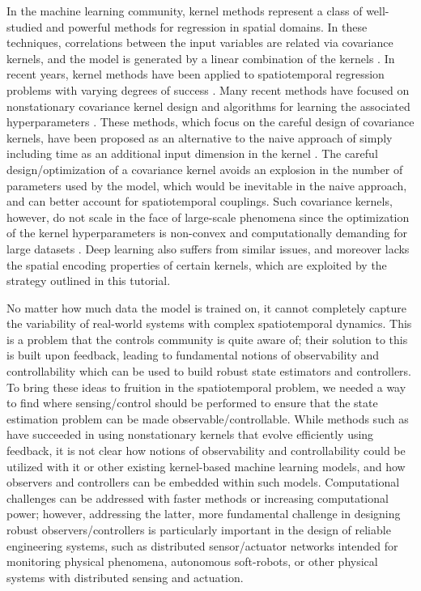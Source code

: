 \documentclass[letterpaper,12pt,peerreviewca,draftcls]{IEEEtran}
\begin{document}
In the machine learning community, kernel methods represent a class of well-studied and powerful methods for regression in spatial domains. In these techniques, correlations between the input variables are related via covariance kernels, and the model is generated by a linear combination of the kernels \cite{RasmussenWilliams2005,schoelkopf01kernelbased,scholkopf2002learning}. In recent years, kernel methods have been applied to spatiotemporal regression problems with varying degrees of success \cite{cressie2011statistics,RasmussenWilliams2005}. Many recent methods have focused on nonstationary covariance kernel design and algorithms for learning the associated hyperparameters \cite{garg2012AAAI,ma2003nonstationary,plagemann2008nonstationary,todescato2017efficient}. These methods, which focus on the careful design of covariance kernels, have been proposed as an alternative to the naive approach of simply including time as an additional input dimension in the kernel \cite{Chowdhary13_CDC1}. The careful design/optimization of a covariance kernel avoids an explosion in the number of parameters used by the model, which would be inevitable in the naive approach, and can better account for spatiotemporal couplings. Such covariance kernels, however, do not scale in the face of large-scale phenomena since the optimization of the kernel hyperparameters is non-convex and computationally demanding for large datasets \cite{sra2012optimization}. Deep learning also suffers from similar issues, and moreover lacks the spatial encoding properties of certain kernels, which are exploited by the strategy outlined in this tutorial.

No matter how much data the model is trained on, it cannot completely capture the variability of real-world systems with complex spatiotemporal dynamics. This is a problem that the controls community is quite aware of; their solution to this is built upon feedback, leading to fundamental notions of observability and controllability which can be used to build robust state estimators and controllers. To bring these ideas to fruition in the spatiotemporal problem, we needed a way to find where sensing/control should be performed to ensure that the state estimation problem can be made observable/controllable. %
While methods such as \cite{todescato2017efficient} have succeeded in using nonstationary kernels that evolve efficiently using feedback, it is not clear how notions of observability and controllability could be utilized with it or other existing kernel-based machine learning models, and how observers and controllers can be embedded within such models.
Computational challenges can be addressed with faster methods or increasing computational power; however, addressing the latter, more fundamental challenge in designing robust observers/controllers is particularly important in the design of reliable engineering systems, such as distributed sensor/actuator networks intended for monitoring physical phenomena, autonomous soft-robots, or other physical systems with distributed sensing and actuation.
\end{document}
